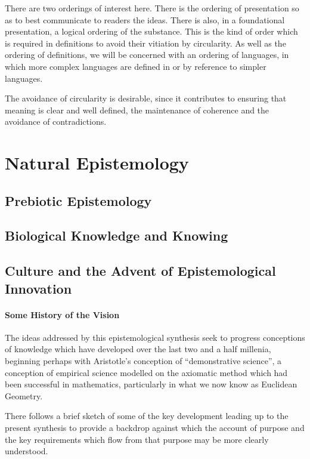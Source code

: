 \documentclass[10pt,titlepage]{book}
\begin{document}
There are two orderings of interest here.
There is the ordering of presentation so as to best communicate to readers the ideas.
There is also, in a foundational presentation, a logical ordering of the substance.
This is the kind of order which is required in definitions to avoid their vitiation by circularity.
As well as the ordering of definitions, we will be concerned with an ordering of languages, in which more complex languages are defined in or by reference to simpler languages.

The avoidance of circularity is desirable, since it contributes to ensuring that meaning is clear and well defined, the maintenance of coherence and the avoidance of contradictions.

\part{Natural Epistemology}

\chapter{Prebiotic Epistemology}

\chapter{Biological Knowledge and Knowing}

\chapter{Culture and the Advent of Epistemological Innovation}

\subsection{Some History of the Vision}

The ideas addressed by this epistemological synthesis seek to progress conceptions of knowledge which have developed over the last two and a half millenia, beginning perhaps with Aristotle's conception of ``demonstrative science'', a conception of empirical science modelled on the axiomatic method which had been successful in mathematics, particularly in what we now know as Euclidean Geometry.

There follows a brief sketch of some of the key development leading up to the present synthesis to provide a backdrop against which the account of purpose and the key requirements which flow from that purpose may be more clearly understood.
\end{document}
